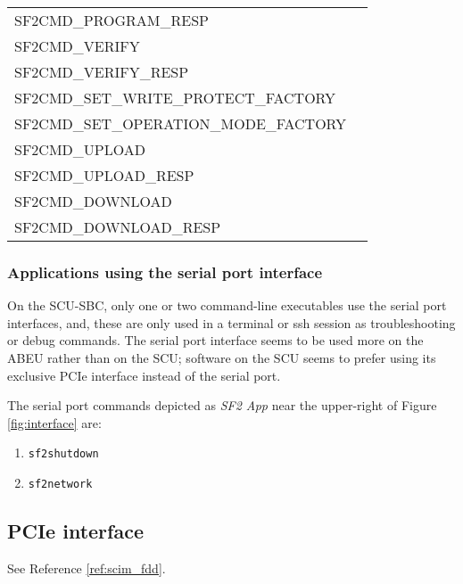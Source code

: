 \documentclass[12pt]{article}
\begin{document}
\begin{table}[H]
{\begin{tabular}{p{4.0in}p{3.0in}}
        SF2CMD\_PROGRAM\_RESP\\
        SF2CMD\_VERIFY\\
        SF2CMD\_VERIFY\_RESP\\
        SF2CMD\_SET\_WRITE\_PROTECT\_FACTORY\\
        SF2CMD\_SET\_OPERATION\_MODE\_FACTORY\\
        SF2CMD\_UPLOAD\\
        SF2CMD\_UPLOAD\_RESP\\
        SF2CMD\_DOWNLOAD\\
        SF2CMD\_DOWNLOAD\_RESP\\

    \hline
    \end{tabular}%
    }
    \label{tab:serial_cmd}
\end{table}

\subsubsection{Applications using the serial port interface}
On the SCU-SBC, only one or two command-line executables use the serial port interfaces, and, these are only used in a terminal or ssh session as troubleshooting or debug commands. The serial port interface seems to be used more on the ABEU rather than on the SCU; software on the SCU seems to prefer using its exclusive PCIe interface instead of the serial port.

The serial port commands depicted as \emph{SF2 App} near the upper-right of Figure \ref{fig:interface} are:

\begin{enumerate}
    \item \texttt{sf2shutdown}
    \item \texttt{sf2network}
\end{enumerate}


\subsection{PCIe interface}

See Reference \ref{ref:scim_fdd}.
\end{document}
